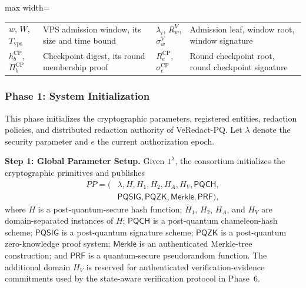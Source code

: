 \documentclass[lettersize,journal]{IEEEtran}
\begin{document}
\begin{table}[t]
\begin{adjustbox}{max width=\textwidth}
\begin{tabular}{@{}ll@{\quad}ll@{}}
\textcolor{e2}{$w$, $W$, $T_{\mathrm{vps}}$}
& \textcolor{e2}{VPS admission window, its size and time bound} &
\textcolor{e2}{$\lambda_i$, $R_w^{V}$, $\sigma_w^{V}$}
& \textcolor{e2}{Admission leaf, window root, window signature}\\

\textcolor{e3}{$h_b^{\mathrm{CP}}$}, \textcolor{e5}{$\Pi_b^{\mathrm{CP}}$}
& \textcolor{e3}{Checkpoint digest}, \textcolor{e5}{its round membership proof} &
\textcolor{e5}{$R_e^{\mathrm{CP}}$, $\sigma_e^{\mathrm{CP}}$}
& \textcolor{e5}{Round checkpoint root, round checkpoint signature}\\

\hline
\end{tabular}
\end{adjustbox}
\end{table}
    
    \subsubsection*{\textbf{Phase 1: System Initialization}}

This phase initializes the cryptographic parameters, registered
entities, redaction policies, and distributed redaction authority of
VeRedact-PQ. Let $\lambda$ denote the security parameter and $e$ the
current authorization epoch.

\textbf{Step 1: Global Parameter Setup.}
Given $1^\lambda$, the consortium initializes the cryptographic
primitives and publishes
\begin{equation}
\begin{aligned}
PP=(&\lambda,H,H_1,H_2,H_A,H_V,\mathsf{PQCH},\\
&\mathsf{PQSIG},\mathsf{PQZK},\mathsf{Merkle},\mathsf{PRF}),
\end{aligned}
\end{equation}
where $H$ is a post-quantum-secure hash function;
$H_1$, $H_2$, $H_A$, and $H_V$ are domain-separated instances of
$H$; $\mathsf{PQCH}$ is a post-quantum chameleon-hash scheme;
$\mathsf{PQSIG}$ is a post-quantum signature scheme;
$\mathsf{PQZK}$ is a post-quantum zero-knowledge proof system;
$\mathsf{Merkle}$ is an authenticated Merkle-tree construction; and
$\mathsf{PRF}$ is a quantum-secure pseudorandom function.
The additional domain $H_V$ is reserved for authenticated
verification-evidence commitments used by the state-aware verification
protocol in Phase~6.
\end{document}
